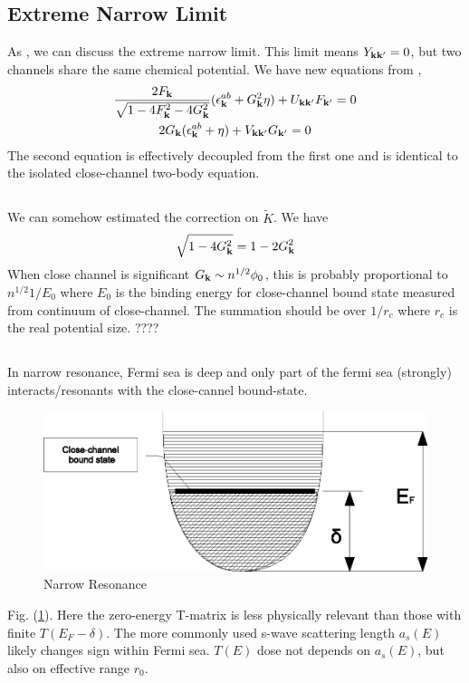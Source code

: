 \subsection{Extreme Narrow Limit}
As \cite{GurarieNarrow}, we can discuss the extreme narrow limit.  This limit means $Y_{\mathbf{k}\mathbf{k}'}=0$, but two channels share the same chemical potential.  We have new equations from ,
\begin{subequations}\label{eq:20100927:gapExtreme}
\begin{gather}\label{eq:20100927:gapa}
\frac{2F_{\mathbf{k}}}{\sqrt{1-4 F_{\mathbf{k}}^2-4 G_{\mathbf{k}}^2}} (\epsilon^{ab}_{\mathbf{k}}+  G_{\mathbf{k}}^2\eta)+U_{\mathbf{k}\mathbf{k}'}F_{\mathbf{k}'}=0\\
\label{eq:20100927:gapb}
{2G_{\ensuremath{\mathbf{k}}}}(\epsilon^{ab}_{\mathbf{k}}+\eta)+V_{\mathbf{k}\mathbf{k}'}G_{\mathbf{k}'}=0
\end{gather}
\end{subequations}
The second equation is effectively decoupled from the first one and is identical to the isolated close-channel two-body \sch equation. 

\subsection{}
We can somehow estimated the  correction on $\tilde{K}$.  We have 
\[\sqrt{1-4G_{\mathbf{k}}^{2}}=1-2G_{\mathbf{k}}^{2}\]
When close channel is significant $G_{\mathbf{k}}\sim{n^{1/2}\phi_{0}}$, this is probably proportional to $n^{1/2}1/E_{0}$ where $E_{0}$ is the binding energy for close-channel bound state measured from continuum of close-channel.  The summation should be over $1/r_{c}$ where $r_{c}$ is the real potential size.  ????

\subsection{}
In narrow resonance, Fermi sea is deep and only part of the fermi sea (strongly) interacts/resonants with the close-cannel bound-state.   
\begin{figure}[hhtb]
	\centering
		\includegraphics[width=.50\textwidth]{image/narrowFR.eps}
	\caption{Narrow Resonance\label{fig:narrowFR}}
\end{figure}
Fig. (\ref{fig:narrowFR}).  Here the zero-energy T-matrix is less  physically relevant than those with finite $T(E_{F}-\delta)$.  The more commonly used s-wave scattering length $a_{s}(E)$ likely changes sign within Fermi sea.  $T(E)$ dose not depends on $a_{s}(E)$, but also on effective range $r_{0}$.  

